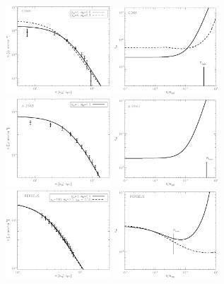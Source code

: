 \documentclass[traditabstract]{aa}
\begin{document}
\begin{figure}[hbt!]
\centering
\includegraphics[width=0.35\textwidth]{figures/SB_profiles_Coma_PAPER.eps}
\includegraphics[width=0.35\textwidth]{figures/XCR_profiles_Coma_PAPER.eps}
\includegraphics[width=0.35\textwidth]{figures/SB_profiles_A2163_PAPER.eps}
\includegraphics[width=0.35\textwidth]{figures/XCR_profiles_A2163_PAPER.eps}
\includegraphics[width=0.35\textwidth]{figures/SB_profiles_Perseus_PAPER.eps}
\includegraphics[width=0.35\textwidth]{figures/XCR_profiles_Perseus_PAPER.eps}

\end{figure}
\end{document}
